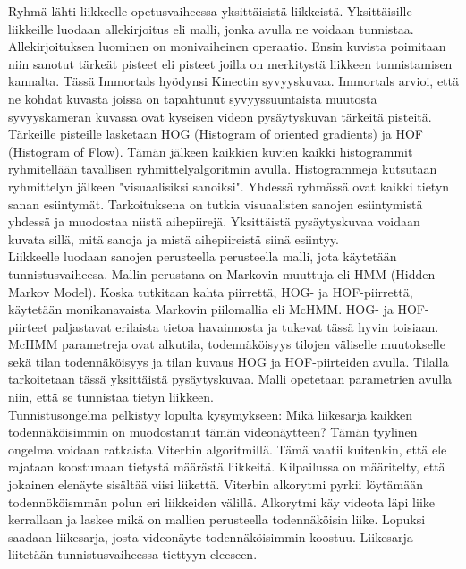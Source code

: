 Ryhmä lähti liikkeelle opetusvaiheessa yksittäisistä liikkeistä. Yksittäisille liikkeille luodaan allekirjoitus eli malli,
jonka avulla ne voidaan tunnistaa. Allekirjoituksen luominen on monivaiheinen operaatio. Ensin kuvista poimitaan niin sanotut
tärkeät pisteet eli pisteet joilla on merkitystä liikkeen tunnistamisen kannalta. Tässä Immortals hyödynsi Kinectin syvyyskuvaa.
Immortals arvioi, että ne kohdat kuvasta joissa on tapahtunut syvyyssuuntaista muutosta syvyyskameran kuvassa ovat kyseisen videon pysäytyskuvan
tärkeitä pisteitä. Tärkeille pisteille lasketaan HOG (Histogram of oriented gradients) ja HOF (Histogram of Flow). 
Tämän jälkeen kaikkien kuvien kaikki histogrammit ryhmitellään tavallisen ryhmittelyalgoritmin avulla.
Histogrammeja kutsutaan ryhmittelyn jälkeen "visuaalisiksi sanoiksi". Yhdessä ryhmässä ovat kaikki tietyn sanan esiintymät.
Tarkoituksena on tutkia visuaalisten sanojen esiintymistä yhdessä ja muodostaa niistä aihepiirejä. 
Yksittäistä pysäytyskuvaa voidaan kuvata sillä, mitä sanoja ja mistä aihepiireistä siinä esiintyy.\\

Liikkeelle luodaan sanojen perusteella perusteella malli, jota käytetään tunnistusvaiheesa. Mallin perustana on Markovin muuttuja
eli HMM (Hidden Markov Model). Koska tutkitaan kahta piirrettä, HOG- ja HOF-piirrettä, käytetään monikanavaista Markovin piilomallia eli McHMM. 
HOG- ja HOF-piirteet paljastavat erilaista tietoa havainnosta ja tukevat tässä hyvin toisiaan. McHMM parametreja ovat alkutila, 
todennäköisyys tilojen väliselle muutokselle sekä tilan todennäköisyys ja tilan kuvaus HOG ja HOF-piirteiden avulla. 
Tilalla tarkoitetaan tässä yksittäistä pysäytyskuvaa. Malli opetetaan parametrien avulla niin, että se tunnistaa tietyn liikkeen. \\

Tunnistusongelma pelkistyy lopulta kysymykseen: Mikä liikesarja kaikken todennäköisimmin on muodostanut tämän videonäytteen?
Tämän tyylinen ongelma voidaan ratkaista Viterbin algoritmillä. Tämä vaatii kuitenkin, että ele rajataan koostumaan tietystä määrästä liikkeitä.
Kilpailussa on määritelty, että jokainen elenäyte sisältää viisi liikettä.
Viterbin alkorytmi pyrkii löytämään todennököismmän polun eri liikkeiden välillä. Alkorytmi käy videota läpi liike kerrallaan ja laskee mikä
on mallien perusteella todennäköisin liike. Lopuksi saadaan liikesarja, josta videonäyte todennäköisimmin koostuu.
Liikesarja liitetään tunnistusvaiheessa tiettyyn eleeseen. \citep {6239185}\\ 



